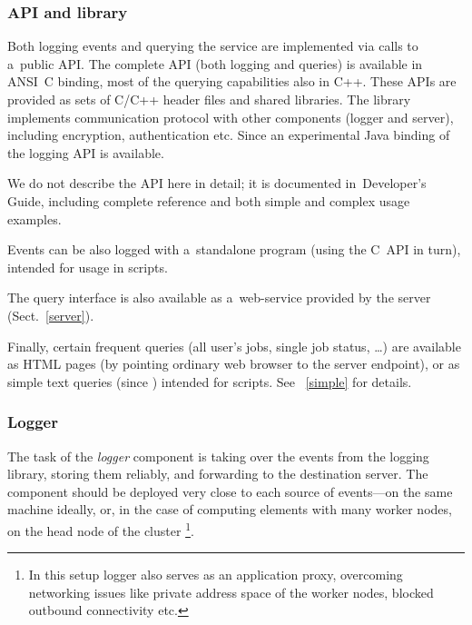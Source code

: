 %
%
\subsubsection{\LB API and library}
Both logging events and querying the service are implemented via
calls to a~public \LB API.
The complete API (both logging and queries)
is available in ANSI~C binding, most of the querying capabilities also in C++.
These APIs are provided as sets of C/C++ header files and shared libraries.
The library implements communication protocol with other \LB components
(logger and server), including encryption, authentication etc.
Since  an experimental Java binding of the logging API is available.

We do not describe the API here in detail; it is documented in~\LB Developer's
Guide\cite{lbdg},
including complete reference and both simple and complex usage examples.

Events can be also logged with a~standalone program (using the C~API in turn),
intended for usage in scripts.

The query interface is also available as a~web-service provided by the
\LB server (Sect.~\ref{server}).

Finally, certain frequent queries (all user's jobs, single job status, \dots)
are available as HTML pages (by pointing ordinary web browser to the \LB server
endpoint), or as simple text queries (since ) intended for scripts.
See~%
\ifx\insideUG\undefined
\cite{lbug}
\else
\ref{simple}
\fi
for details.

\subsubsection{Logger}
\label{comp:logger}
The task of the \emph{logger} component is taking over the events from
the logging library, storing them reliably, and forwarding to the destination
server.
The component should be deployed very close to each source of events---on the
same machine ideally, or, in the case of computing elements with many
worker nodes, on the head node of the cluster%
\footnote{In this setup logger also serves as an application proxy,
overcoming networking issues like private address space of the worker nodes,
blocked outbound connectivity etc.}.

